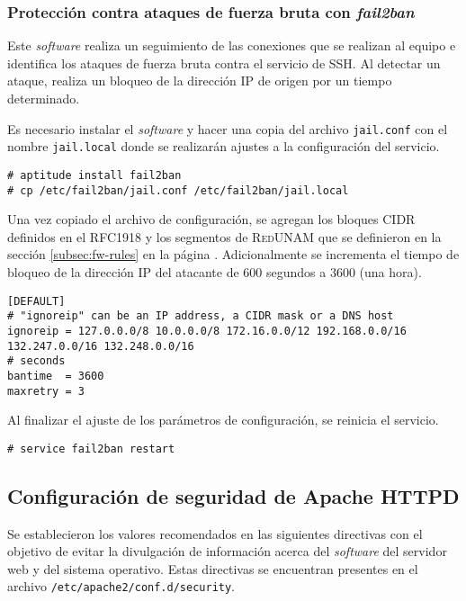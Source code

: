         \subsubsection {Protecci\'{o}n contra ataques de fuerza bruta con \textit{fail2ban}}

Este \textit{software} realiza un seguimiento de las conexiones que se realizan al equipo e identifica los ataques de fuerza bruta contra el servicio de \textsc{SSH}. Al detectar un ataque, realiza un bloqueo de la direcci\'{o}n \textsc{IP} de origen por un tiempo determinado.

Es necesario instalar el \textit{software} y hacer una copia del archivo \texttt{jail.conf} con el nombre \texttt{jail.local} donde se realizar\'{a}n ajustes a la configuraci\'{o}n del servicio.

{
\scriptsize
\linespread{1}
\begin{verbatim}
# aptitude install fail2ban
# cp /etc/fail2ban/jail.conf /etc/fail2ban/jail.local
\end{verbatim}
}

Una vez copiado el archivo de configuraci\'{o}n, se agregan los bloques \textsc{CIDR} definidos en el \textsc{RFC1918} y los segmentos de \textsc{RedUNAM} que se definieron en la secci\'{o}n \ref{subsec:fw-rules} en la p\'{a}gina \pageref{subsec:fw-rules}. Adicionalmente se incrementa el tiempo de bloqueo de la direcci\'{o}n IP del atacante de 600 segundos a 3600 (una hora).

{
\scriptsize
\linespread{1}
\begin{verbatim}
[DEFAULT]
# "ignoreip" can be an IP address, a CIDR mask or a DNS host
ignoreip = 127.0.0.0/8 10.0.0.0/8 172.16.0.0/12 192.168.0.0/16 132.247.0.0/16 132.248.0.0/16
# seconds
bantime  = 3600
maxretry = 3
\end{verbatim}
}

Al finalizar el ajuste de los par\'{a}metros de configuraci\'{o}n, se reinicia el servicio.

{
\scriptsize
\linespread{1}
\begin{verbatim}
# service fail2ban restart
\end{verbatim}
}

      \subsection {Configuraci\'{o}n de seguridad de Apache \textsc{HTTPD}}

Se establecieron los valores recomendados en las siguientes directivas con el objetivo de evitar la divulgaci\'{o}n de informaci\'{o}n acerca del \textit{software} del servidor web y del sistema operativo. Estas directivas se encuentran presentes en el archivo \texttt{/etc/apache2/conf.d/security}.

